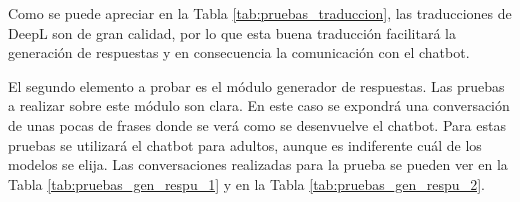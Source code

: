 Como se puede apreciar en la Tabla \ref{tab:pruebas_traduccion}, las traducciones de DeepL son de gran calidad, por lo que esta buena traducción facilitará la generación de respuestas y en consecuencia la comunicación con el chatbot.

El segundo elemento a probar es el módulo generador de respuestas. Las pruebas a realizar sobre este módulo son clara. En este caso se expondrá una conversación de unas pocas de frases donde se verá como se desenvuelve el chatbot. Para estas pruebas se utilizará el chatbot para adultos, aunque es indiferente cuál de los modelos se elija. Las conversaciones realizadas para la prueba se pueden ver en la Tabla \ref{tab:pruebas_gen_respu_1} y en la Tabla \ref{tab:pruebas_gen_respu_2}.


\begin{table}[h]
\centering
{}
\end{table}
